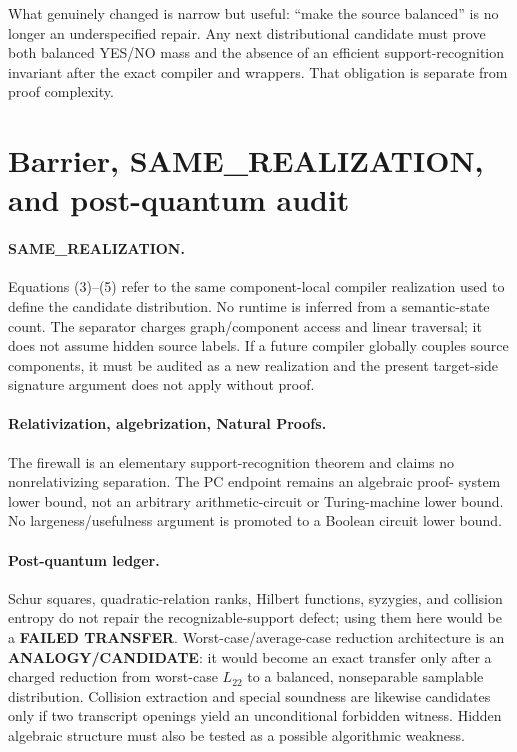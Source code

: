 \documentclass[11pt]{article}
\newcommand{\Ltwo}{L_{22}}
\begin{document}
What genuinely changed is narrow but useful: ``make the source balanced'' is
no longer an underspecified repair.  Any next distributional candidate must
prove both balanced YES/NO mass and the absence of an efficient
support-recognition invariant after the exact compiler and wrappers.  That
obligation is separate from proof complexity.

\section{Barrier, SAME\_REALIZATION, and post-quantum audit}
\paragraph{SAME\_REALIZATION.}
Equations (3)--(5) refer to the same component-local compiler realization
used to define the candidate distribution.  No runtime is inferred from a
semantic-state count.  The separator charges graph/component access and
linear traversal; it does not assume hidden source labels.  If a future
compiler globally couples source components, it must be audited as a new
realization and the present target-side signature argument does not apply
without proof.

\paragraph{Relativization, algebrization, Natural Proofs.}
The firewall is an elementary support-recognition theorem and claims no
nonrelativizing separation.  The PC endpoint remains an algebraic proof-
system lower bound, not an arbitrary arithmetic-circuit or Turing-machine
lower bound.  No largeness/usefulness argument is promoted to a Boolean
circuit lower bound.

\paragraph{Post-quantum ledger.}
Schur squares, quadratic-relation ranks, Hilbert functions, syzygies, and
collision entropy do not repair the recognizable-support defect; using them
here would be a \textbf{FAILED TRANSFER}.  Worst-case/average-case reduction
architecture is an \textbf{ANALOGY/CANDIDATE}: it would become an exact
transfer only after a charged reduction from worst-case $\Ltwo$ to a
balanced, nonseparable samplable distribution.  Collision extraction and
special soundness are likewise candidates only if two transcript openings
yield an unconditional forbidden witness.  Hidden algebraic structure must
also be tested as a possible algorithmic weakness.
\end{document}
